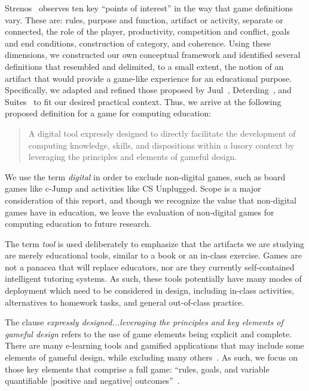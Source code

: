 \documentclass{sig-alternate-05-2015}
\begin{document}
Strenos~\cite{stenros2016review-definingGames} observes ten key ``points of interest'' in the way that game definitions vary. These are: rules, purpose and function, artifact or activity, separate or connected, the role of the player, productivity, competition and conflict, goals and end conditions, construction of category, and coherence. Using these dimensions, we constructed our own conceptual framework and identified several definitions that resembled and delimited, to a small extent, the notion of an artifact that would provide a game-like experience for an educational purpose. Specifically, we adapted and refined those proposed by Juul~\cite{juul2011half}, Deterding~\cite{deterding2011-definingGamification}, and Suites~\cite{suits2014grasshopper} to fit our desired practical context. Thus, we arrive at the following proposed definition for a game for computing education:

\begin{quote}


A digital tool expressly designed to directly facilitate the development of computing knowledge, skills, and dispositions within a lusory context by leveraging the principles and elements of gameful design.\end{quote}




We use the term {\em digital} in order to exclude non-digital games, such as board games like c-Jump and activities like CS Unplugged. Scope is a major consideration of this report, and though we recognize the value that non-digital games have in education, we leave the evaluation of non-digital games for computing education to future research.



The term {\em tool} is used deliberately to emphasize that the artifacts we are studying are merely educational tools, similar to a book or an in-class exercise. Games are not a panacea that will replace educators, nor are they currently self-contained intelligent tutoring systems. As such, these tools potentially have many modes of deployment which need to be considered in design, including in-class activities, alternatives to homework tasks, and general out-of-class practice.



The clause {\em expressly designed...leveraging the principles and key elements of gameful design} refers to the use of game elements being explicit and complete. There are many e-learning tools and gamified applications that may include some elements of gameful design, while excluding many others~\cite{deterding2011-gameElements}. As such, we focus on those key elements that comprise a full game: ``rules, goals, and variable quantifiable [positive and negative] outcomes''~\cite{juul2011half}.
\end{document}
